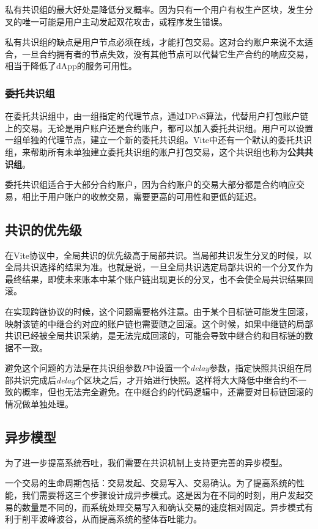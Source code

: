 \documentclass[UTF8,nofonts]{ctexart}
\begin{document}
\begin{multicols}{2}
私有共识组的最大好处是降低分叉概率。因为只有一个用户有权生产区块，发生分叉的唯一可能是用户主动发起双花攻击，或程序发生错误。

私有共识组的缺点是用户节点必须在线，才能打包交易。这对合约账户来说不太适合，一旦合约拥有者的节点失效，没有其他节点可以代替它生产合约的响应交易，相当于降低了dApp的服务可用性。

\subsubsection{委托共识组}
在委托共识组中，由一组指定的代理节点，通过DPoS算法，代替用户打包账户链上的交易。无论是用户账户还是合约账户，都可以加入委托共识组。用户可以设置一组单独的代理节点，建立一个新的委托共识组。Vite中还有一个默认的委托共识组，来帮助所有未单独建立委托共识组的账户打包交易，这个共识组也称为\textbf{公共共识组}。

委托共识组适合于大部分合约账户，因为合约账户的交易大部分都是合约响应交易，相比于用户账户的收款交易，需要更高的可用性和更低的延迟。

\subsection{共识的优先级}
在Vite协议中，全局共识的优先级高于局部共识。当局部共识发生分叉的时候，以全局共识选择的结果为准。也就是说，一旦全局共识选定局部共识的一个分叉作为最终结果，即使未来账本中某个账户链出现更长的分叉，也不会使全局共识结果回滚。

在实现跨链协议的时候，这个问题需要格外注意。由于某个目标链可能发生回滚，映射该链的中继合约对应的账户链也需要随之回滚。这个时候，如果中继链的局部共识已经被全局共识采纳，是无法完成回滚的，可能会导致中继合约和目标链的数据不一致。

避免这个问题的方法是在共识组参数$P$中设置一个\textit{delay}参数，指定快照共识组在局部共识完成后\textit{delay}个区块之后，才开始进行快照。这样将大大降低中继合约不一致的概率，但也无法完全避免。在中继合约的代码逻辑中，还需要对目标链回滚的情况做单独处理。

\subsection{异步模型}
为了进一步提高系统吞吐，我们需要在共识机制上支持更完善的异步模型。

一个交易的生命周期包括：交易发起、交易写入、交易确认。为了提高系统的性能，我们需要将这三个步骤设计成异步模式。这是因为在不同的时刻，用户发起交易的数量是不同的，而系统处理交易写入和确认交易的速度相对固定。异步模式有利于削平波峰波谷，从而提高系统的整体吞吐能力。


\end{multicols}
\end{document}

